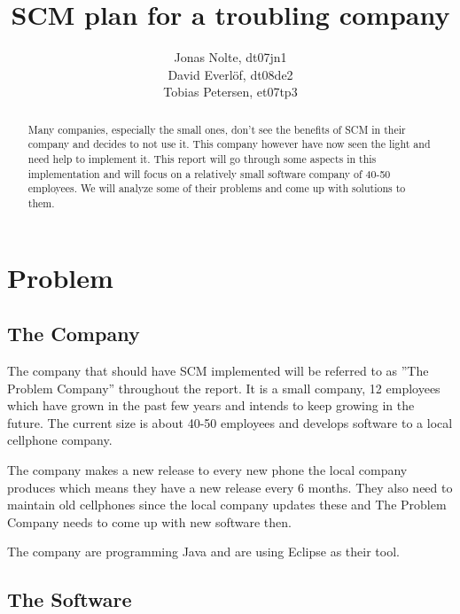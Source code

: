 \documentclass[a4paper,10pt]{article}
\title{SCM plan for a troubling company}
\author{Jonas Nolte, dt07jn1\\
David Everlöf, dt08de2\\
Tobias Petersen, et07tp3}
\begin{document}
\maketitle

\begin{abstract}

Many companies, especially the small ones, don't see the benefits of SCM in their company and decides to not use it.
This company however have now seen the light and need help to implement it.
This report will go through some aspects in this implementation and will focus on a relatively small software company of 40-50 employees.
We will analyze some of their problems and come up with solutions to them.


\end{abstract}
\newpage

\tableofcontents
\newpage

\section{Problem}

\subsection{The Company}

The company that should have SCM implemented will be referred to as ''The Problem Company'' throughout the report.
It is a small company, 12 employees which have grown in the past few years and intends to keep growing in the future.
The current size is about 40-50 employees and develops software to a local cellphone company.

The company makes a new release to every new phone the local company produces which means they have a new release every 6 months.
They also need to maintain old cellphones since the local company updates these and The Problem Company needs to come up with new software then.

The company are programming Java and are using Eclipse as their tool.

\subsection{The Software}
\end{document}
